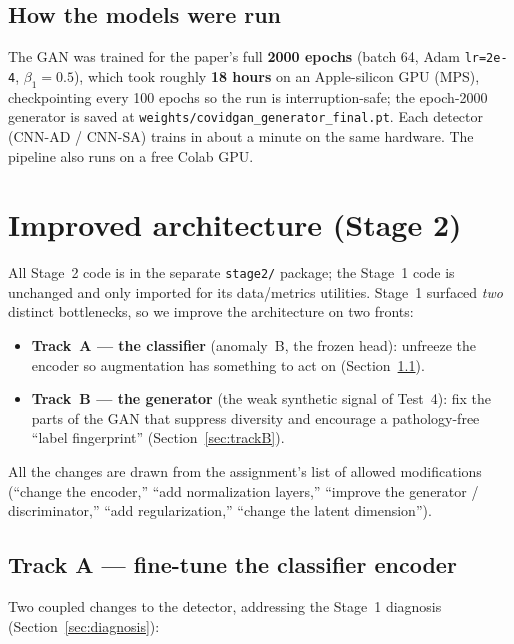 \documentclass[11pt]{article}
\newcommand{\code}[1]{\texttt{#1}}
\begin{document}
\subsection{How the models were run}
The GAN was trained for the paper's full \textbf{2000 epochs} (batch 64,
Adam \code{lr=2e-4}, $\beta_1=0.5$), which took roughly \textbf{18 hours} on an
Apple-silicon GPU (MPS), checkpointing every 100 epochs so the run is
interruption-safe; the epoch-2000 generator is saved at
\code{weights/covidgan\_generator\_final.pt}. Each detector (CNN-AD / CNN-SA)
trains in about a minute on the same hardware. The pipeline also runs on a free
Colab GPU.

\section{Improved architecture (Stage 2)}

All Stage~2 code is in the separate \code{stage2/} package; the Stage~1 code is
unchanged and only imported for its data/metrics utilities. Stage~1 surfaced
\emph{two} distinct bottlenecks, so we improve the architecture on two fronts:

\begin{itemize}[nosep,leftmargin=1.4em]
  \item \textbf{Track~A --- the classifier} (anomaly~B, the frozen head): unfreeze
        the encoder so augmentation has something to act on
        (Section~\ref{sec:trackA}).
  \item \textbf{Track~B --- the generator} (the weak synthetic signal of Test~4):
        fix the parts of the GAN that suppress diversity and encourage a
        pathology-free ``label fingerprint'' (Section~\ref{sec:trackB}).
\end{itemize}

All the changes are drawn from the assignment's list of allowed modifications
(``change the encoder,'' ``add normalization layers,'' ``improve the generator /
discriminator,'' ``add regularization,'' ``change the latent dimension'').

\subsection{Track A --- fine-tune the classifier encoder}
\label{sec:trackA}
Two coupled changes to the detector, addressing the Stage~1 diagnosis
(Section~\ref{sec:diagnosis}):
\end{document}
